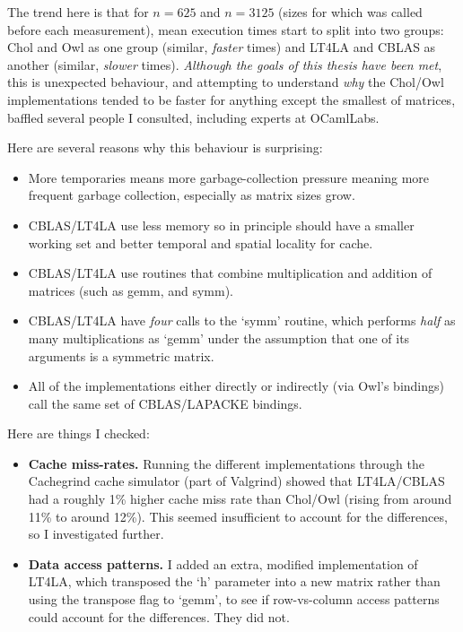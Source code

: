 The trend here is that for $n=625$ and $n=3125$ (sizes for which
 was called before each measurement), mean execution times
start to split into two groups: Chol and Owl as one group (similar,
\emph{faster} times) and LT4LA and CBLAS as another (similar, \emph{slower}
times). \emph{Although the goals of this thesis have been met}, this is
unexpected behaviour, and attempting to understand \emph{why} the Chol/Owl
implementations tended to be faster for anything except the smallest of
matrices, baffled several people I consulted, including experts at OCamlLabs.

Here are several reasons why this behaviour is surprising:

\begin{itemize}

    \item More temporaries means more garbage-collection pressure meaning
        more frequent garbage collection, especially as matrix sizes grow.

    \item CBLAS/LT4LA use less memory so in principle should have a smaller
        working set and better temporal and spatial locality for cache.

    \item CBLAS/LT4LA use routines that combine multiplication and addition
        of matrices (such as gemm, and symm).

    \item CBLAS/LT4LA have \emph{four} calls to the `symm' routine, which
        performs \emph{half} as many multiplications as `gemm' under the
        assumption that one of its arguments is a symmetric matrix.

    \item All of the implementations either directly or indirectly (via Owl's
        bindings) call the same set of CBLAS/LAPACKE bindings.

\end{itemize}

Here are things I checked:

\begin{itemize}
    
    \item \textbf{Cache miss-rates.}  Running the different implementations
        through the Cachegrind cache simulator (part of Valgrind) showed that
        LT4LA/CBLAS had a roughly 1\% higher cache miss rate than Chol/Owl
        (rising from around 11\% to around 12\%). This seemed insufficient to
        account for the differences, so I investigated further.

    \item \textbf{Data access patterns.} I added an extra, modified
        implementation of LT4LA, which transposed the `h' parameter into a new
        matrix rather than using the transpose flag to `gemm', to see if
        row-vs-column access patterns could account for the differences. They
        did not.

\end{itemize}

